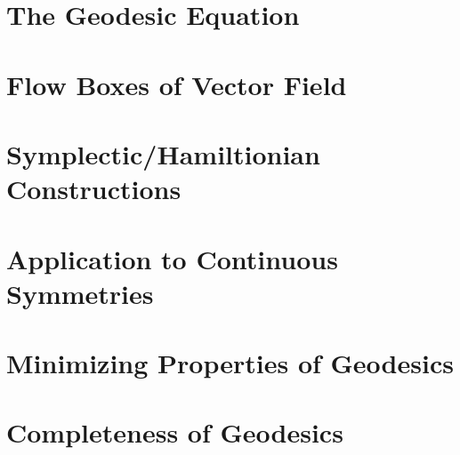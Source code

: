 \documentclass{article}
\begin{document}

\tableofcontents
\newpage

\section{The Geodesic Equation}

\section{Flow Boxes of Vector Field}

\section{Symplectic/Hamiltionian Constructions}

\section{Application to Continuous Symmetries}

\section{Minimizing Properties of Geodesics}

\section{Completeness of Geodesics}
\end{document}
